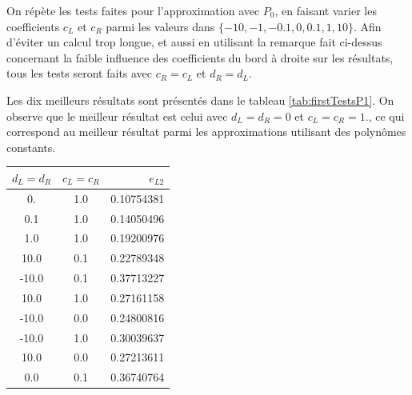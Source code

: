 \indent On répète les tests faites pour l'approximation avec $P_0$, en faisant varier les coefficients $c_L$ et $c_R$ parmi les valeurs dans $\{-10,-1,-0.1,0,0.1,1,10\}$. Afin d'éviter un calcul trop longue, et aussi en utilisant la remarque fait ci-dessus concernant la faible influence des coefficients du bord à droite sur les résultats, tous les tests seront faits avec $c_R = c_L$ et $d_R = d_L$.

\indent Les dix meilleurs résultats sont présentés dans le tableau \ref{tab:firstTestsP1}. On observe que le meilleur résultat est celui avec $d_L = d_R = 0$ et $c_L = c_R = 1. $, ce qui correspond au meilleur résultat parmi les approximations utilisant des polynômes constants.



\begin{center}
\begin{tabular}{c|c|S[round-precision=4,table-number-alignment =  left]}
	  &  &  \\
	. & 1.0 & 0.10754381 \\
	0.1 & 1.0 & 0.14050496 \\
	1.0 & 1.0 & 0.19200976 \\
	10.0 & 0.1 & 0.22789348 \\
	-10.0 & 0.1 & 0.37713227 \\
	10.0 & 1.0 & 0.27161158 \\
	-10.0 &  0.0 & 0.24800816\\
	-10.0 & 1.0 & 0.30039637 \\
	10.0 & 0.0 & 0.27213611 \\
	0.0 & 0.1 & 0.36740764
\end{tabular}
\end{center}


